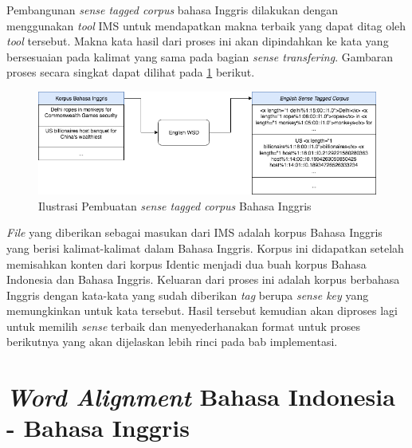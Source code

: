 Pembangunan \textit{sense tagged corpus} bahasa Inggris dilakukan dengan menggunakan \textit{tool} IMS \citep{zhong2010makes} untuk mendapatkan makna terbaik yang dapat ditag oleh \textit{tool} tersebut. Makna kata hasil dari proses ini akan dipindahkan ke kata yang bersesuaian pada kalimat yang sama pada bagian \textit{sense transfering}. Gambaran proses secara singkat dapat dilihat pada \ref{fig:producing-en-tag-corpus} berikut.


\begin{figure}
	\centering
	\includegraphics[width=1\linewidth]{adit_pics/bab-3-en-tag-corpus.png}
	\caption{Ilustrasi Pembuatan \textit{sense tagged corpus} Bahasa Inggris}
	\label{fig:producing-en-tag-corpus}
\end{figure}

\textit{File} yang diberikan sebagai masukan dari IMS adalah korpus Bahasa Inggris yang berisi kalimat-kalimat  dalam Bahasa Inggris. Korpus ini didapatkan setelah memisahkan konten dari korpus Identic menjadi dua buah korpus Bahasa Indonesia dan Bahasa Inggris. Keluaran dari proses ini adalah korpus berbahasa Inggris dengan kata-kata yang sudah diberikan \textit{tag} berupa \textit{sense key} yang memungkinkan untuk kata tersebut. Hasil tersebut kemudian akan diproses lagi untuk memilih \textit{sense} terbaik dan menyederhanakan format untuk proses berikutnya yang akan dijelaskan lebih rinci pada bab implementasi.
\section{\textit{Word Alignment} Bahasa Indonesia - Bahasa Inggris}

